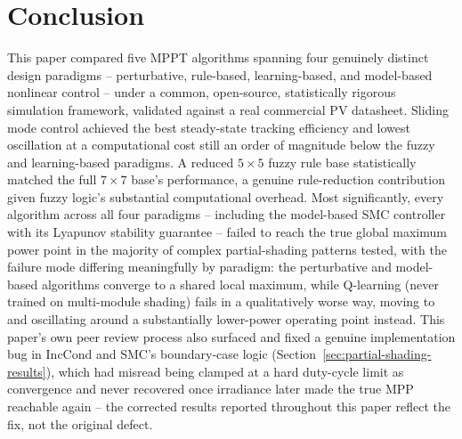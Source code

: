 \section{Conclusion}
\label{sec:conclusion}

This paper compared five MPPT algorithms spanning four genuinely distinct
design paradigms -- perturbative, rule-based, learning-based, and
model-based nonlinear control -- under a common, open-source, statistically
rigorous simulation framework, validated against a real commercial PV
datasheet. Sliding mode control achieved the best steady-state tracking
efficiency and lowest oscillation at a computational cost still an order
of magnitude below the fuzzy and learning-based paradigms. A
reduced $5\times5$ fuzzy rule base statistically matched the full
$7\times7$ base's performance, a genuine rule-reduction contribution given
fuzzy logic's substantial computational overhead. Most significantly,
every algorithm across all four paradigms -- including the model-based SMC
controller with its Lyapunov stability guarantee -- failed to reach the
true global maximum power point in the majority of complex partial-shading
patterns tested, with the failure mode differing meaningfully by paradigm:
the perturbative and model-based algorithms converge to a shared local
maximum, while Q-learning (never trained on multi-module shading) fails in
a qualitatively worse way, moving to and oscillating around a
substantially lower-power operating point instead. This paper's own peer
review process also surfaced and fixed a genuine implementation bug in
IncCond and SMC's boundary-case logic (Section~\ref{sec:partial-shading-results}),
which had misread being clamped at a hard duty-cycle limit as convergence
and never recovered once irradiance later made the true MPP reachable
again -- the corrected results reported throughout this paper reflect
the fix, not the original defect.

